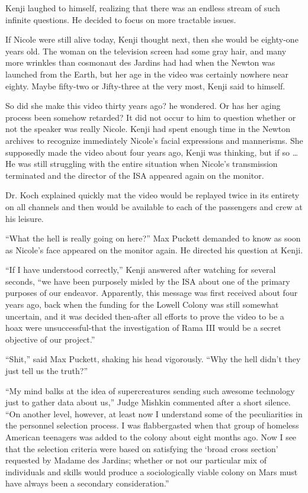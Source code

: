 \documentclass[]{article}
\begin{document}
{Kenji laughed to himself, realizing that there was an endless stream of such infinite questions.  He decided to focus on more tractable issues.

If Nicole were still alive today, Kenji thought next, then she would be eighty-one years old.  The woman on the television screen had some gray hair, and many more wrinkles than cosmonaut des Jardins had had when the Newton was launched from the Earth, but her age in the video was certainly nowhere near eighty.  Maybe fifty-two or Jifty-three at the very most, Kenji said to himself.

So did she make this video thirty years ago? he wondered.  Or has her aging process been somehow retarded? It did not occur to him to question whether or not the speaker was really Nicole.  Kenji had spent enough time in the Newton archives to recognize immediately Nicole’s facial expressions and mannerisms.  She supposedly made the video about four years ago, Kenji was thinking, but if so … He was still struggling with the entire situation when Nicole’s transmission terminated and the director of the ISA appeared again on the monitor.

Dr.  Koch explained quickly mat the video would be replayed twice in its entirety on all channels and then would be available to each of the passengers and crew at his leisure.

“What the hell is really going on here?” Max Puckett demanded to know as soon as Nicole’s face appeared on the monitor again.  He directed his question at Kenji.

“If I have understood correctly,” Kenji answered after watching for several seconds, “we have been purposely misled by the ISA about one of the primary purposes of our endeavor.  Apparently, this message was first received about four years ago, back when the funding for the Lowell Colony was still somewhat uncertain, and it was decided then-after all efforts to prove the video to be a hoax were unsuccessful-that the investigation of Rama III would be a secret objective of our project.”

“Shit,” said Max Puckett, shaking his head vigorously.  “Why the hell didn’t they just tell us the truth?”

“My mind balks at the idea of supercreatures sending such awesome technology just to gather data about us,” Judge Mishkin commented after a short silence.  “On another level, however, at least now I understand some of the peculiarities in the personnel selection process.  I was flabbergasted when that group of homeless American teenagers was added to the colony about eight months ago.  Now I see that the selection criteria were based on satisfying the ‘broad cross section’ requested by Madame des Jardins; whether or not our particular mix of individuals and skills would produce a sociologically viable colony on Mars must have always been a secondary consideration.”

}
\end{document}
